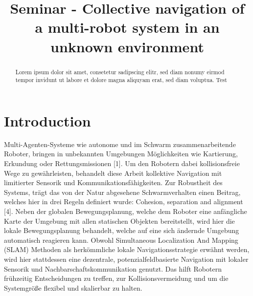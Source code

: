 \documentclass[conference]{IEEEtran}
\begin{document}
\title{Seminar - Collective navigation of a multi-robot system in an unknown environment}
\author{
}

\maketitle


\begin{abstract}
Lorem ipsum dolor sit amet, consetetur sadipscing elitr, sed diam nonumy eirmod tempor invidunt ut labore et dolore magna aliquyam erat, sed diam voluptua.
Test \cite{Olcay.2020}
\end{abstract}

\section{Introduction}
Multi-Agenten-Systeme wie autonome und im Schwarm zusammenarbeitende Roboter, bringen in unbekannten Umgebungen Möglichkeiten wie Kartierung, Erkundung oder Rettungsmissionen [1]. Um den Robotern dabei kollisionsfreie Wege zu gewährleisten, behandelt diese Arbeit kollektive Navigation mit limitierter Sensorik und Kommunikationsfähigkeiten.
Zur Robustheit des Systems, trägt das von der Natur abgesehene Schwarmverhalten einen Beitrag, welches hier in drei Regeln definiert wurde: Cohesion, separation and alignment [4].
Neben der globalen Bewegungsplanung, welche dem Roboter eine anfängliche Karte der Umgebung mit allen statischen Objekten bereitstellt, wird hier die lokale Bewegungsplanung behandelt, welche auf eine sich ändernde Umgebung automatisch reagieren kann.
Obwohl Simultaneous Localization And Mapping (SLAM) Methoden als herkömmliche lokale Navigationsstrategie erwähnt werden, wird hier stattdessen eine dezentrale, potenzialfeldbasierte Navigation mit lokaler Sensorik und Nachbarschaftskommunikation genutzt. Das hilft Robotern frühzeitig Entscheidungen zu treffen, zur Kollisionsvermeidung und um die Systemgröße flexibel und skalierbar zu halten. 
\end{document}
